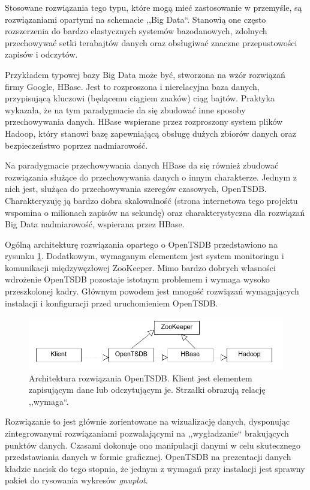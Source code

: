 \documentclass[a4paper,polish,12pt,twoside]{article}
\begin{document}
Stosowane rozwiązania tego typu, które mogą mieć zastosowanie w przemyśle, są rozwiązaniami opartymi na schemacie ,,Big Data``. Stanowią one często rozszerzenia do bardzo elastycznych systemów bazodanowych, zdolnych przechowywać setki terabajtów danych oraz obsługiwać znaczne przepustowości zapisów i odczytów. 

Przykładem typowej bazy Big Data może być, stworzona na wzór rozwiązań firmy Google, HBase\cite{hbase}. Jest to rozproszona i nierelacyjna baza danych, przypisującą kluczowi (będącemu ciągiem znaków) ciąg bajtów. Praktyka wykazała, że na tym paradygmacie da się zbudować inne sposoby przechowywania danych. HBase wspierane przez rozproszony system plików Hadoop\cite{Shvachko:2010:HDF:1913798.1914427}, który stanowi bazę zapewniającą obsługę dużych zbiorów danych oraz bezpieczeństwo poprzez nadmiarowość.

Na paradygmacie przechowywania danych HBase da się również zbudować rozwiązania służące do przechowywania danych o innym charakterze. Jednym z nich jest, służąca do przechowywania szeregów czasowych, OpenTSDB. Charakteryzuję ją bardzo dobra skalowalność (strona internetowa tego projektu wspomina o milionach zapisów na sekundę) oraz charakterystyczna dla rozwiązań Big Data nadmiarowość, wspierana przez HBase.

Ogólną architekturę rozwiązania opartego o OpenTSDB przedstawiono na rysunku \ref{fig:opentsdb_architecture}. Dodatkowym, wymaganym elementem jest system monitoringu i komunikacji międzywęzłowej ZooKeeper. Mimo bardzo dobrych własności wdrożenie OpenTSDB pozostaje istotnym problemem i wymaga wysoko przeszkolonej kadry. Głównym powodem jest mnogość rozwiązań wymagających instalacji i konfiguracji przed uruchomieniem OpenTSDB.

	\begin{figure}[h]
		\centering \includegraphics[width=15cm]{opentsdb_architecture}
		\caption[Architektura rozwiązania OpenTSDB]{Architektura rozwiązania OpenTSDB. Klient jest elementem zapisującym dane lub odczytującym je. Strzałki obrazują relację ,,wymaga``.}
		\label{fig:opentsdb_architecture}
	\end{figure}

Rozwiązanie to jest głównie zorientowane na wizualizację danych, dysponując zintegrowanymi rozwiązaniami pozwalającymi na ,,wygładzanie`` brakujących punktów danych. Czasami dokonuje ono manipulacji danymi w celu skutecznego przedstawiania danych w formie graficznej. OpenTSDB na prezentacji danych kładzie nacisk do tego stopnia, że jednym z wymagań przy instalacji jest sprawny pakiet do rysowania wykresów \textit{gnuplot}.
\end{document}
